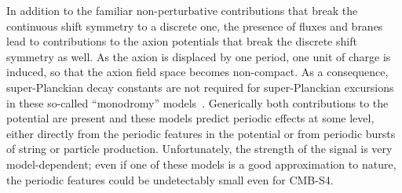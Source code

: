 

In addition to the familiar non-perturbative contributions that break the continuous shift symmetry to a discrete one, the presence of fluxes and branes lead to contributions to the axion potentials that break the discrete shift symmetry as well. As the axion is displaced by one period, one unit of charge is induced, so that the axion field space becomes non-compact. As a consequence, super-Planckian decay constants are not required for super-Planckian excursions in these so-called ``monodromy'' models~\cite{Silverstein:2008sg, McAllister:2008hb, Kaloper:2008fb, Berg:2009tg, Palti:2014kza,McAllister:2014mpa, Marchesano:2014mla, Blumenhagen:2015xpa,Hebecker:2015tzo}. Generically both contributions to the potential are present and these models predict periodic effects at some level, either directly from the periodic features in the potential or from periodic bursts of string or particle production. Unfortunately, the strength of the signal is very model-dependent; even if one of these models is a good approximation to nature, the periodic features could be undetectably small even for CMB-S4.

